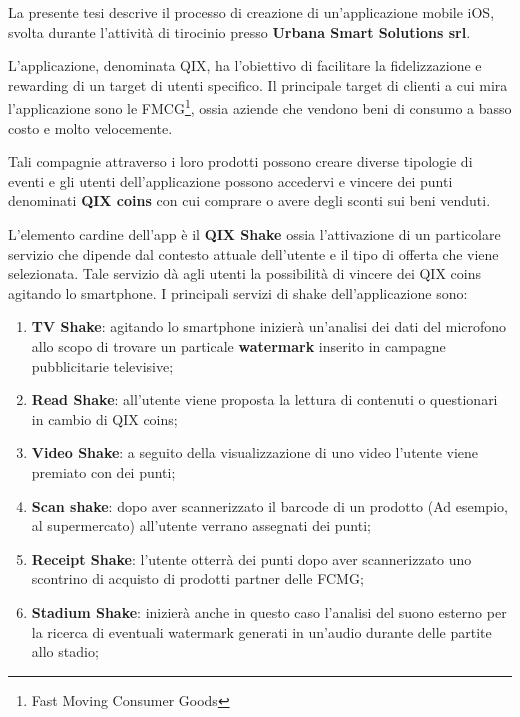 \normalsize
La presente tesi descrive il processo di creazione di un'applicazione mobile iOS, svolta durante l'attività di tirocinio presso \textbf{Urbana Smart Solutions srl}\cite{urbanasmartsolutions}.

L'applicazione, denominata QIX, ha l'obiettivo di facilitare la fidelizzazione e rewarding di un target di utenti specifico. 
Il principale target di clienti a cui mira l'applicazione sono le FMCG\footnote{Fast Moving Consumer
Goods}, ossia aziende che vendono beni di consumo a basso
costo e molto velocemente.

Tali compagnie attraverso i loro prodotti possono creare diverse
tipologie di eventi e gli utenti dell’applicazione possono accedervi
e vincere dei punti denominati \textbf{QIX coins} con cui comprare o avere degli
sconti sui beni venduti.


L’elemento cardine dell’app è il \textbf{QIX Shake} ossia l’attivazione di un particolare servizio
che dipende dal contesto attuale dell'utente e il tipo di offerta che viene selezionata.
Tale servizio dà agli utenti la possibilità di vincere dei QIX coins agitando lo smartphone.
I principali servizi di shake dell'applicazione sono:

\begin{enumerate}
    \item\textbf{TV Shake}: agitando lo smartphone inizierà un'analisi dei dati del microfono
    allo scopo di trovare un particale \textbf{watermark} inserito in campagne pubblicitarie televisive;
    \item\textbf{Read Shake}: all'utente viene proposta la lettura di contenuti o questionari in cambio di QIX coins;
    \item\textbf{Video Shake}: a seguito della visualizzazione di uno video l'utente viene premiato con dei punti;
    \item\textbf{Scan shake}: dopo aver scannerizzato il barcode di un prodotto (Ad esempio, al supermercato) all'utente verrano assegnati dei punti;
    \item\textbf{Receipt Shake}: l'utente otterrà dei punti dopo aver scannerizzato uno scontrino di acquisto di prodotti partner delle FCMG;
    \item\textbf{Stadium Shake}: inizierà anche in questo caso l'analisi del suono esterno per la ricerca di eventuali watermark
    generati in un'audio durante delle partite allo stadio;
\end{enumerate}

